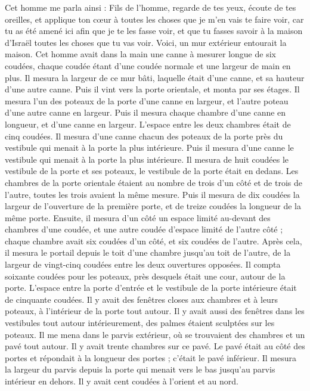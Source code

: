 \begin{multicols}{2}
Cet homme me parla ainsi : Fils de l’homme, regarde de tes yeux, écoute de tes oreilles, et applique ton cœur à toutes les choses que je m'en vais te faire voir, car tu as été amené ici afin que je te les fasse voir, et que tu fasses savoir à la maison d'Israël toutes les choses que tu vas voir.
Voici, un mur extérieur entourait la maison. Cet homme avait dans la main une canne à mesurer longue de six coudées, chaque coudée étant d'une coudée normale et une largeur de main en plus. Il mesura la largeur de ce mur bâti, laquelle était d'une canne, et sa hauteur d'une autre canne.
Puis il vint vers la porte orientale, et monta par ses étages. Il mesura l'un des poteaux de la porte d'une canne en largeur, et l'autre poteau d'une autre canne en largeur.
Puis il mesura chaque chambre d'une canne en longueur, et d'une canne en largeur. L’espace entre les deux chambres était de cinq coudées. Il mesura d'une canne chacun des poteaux de la porte près du vestibule qui menait à la porte la plus intérieure.
Puis il mesura d'une canne le vestibule qui menait à la porte la plus intérieure.
Il mesura de huit coudées le vestibule de la porte et ses poteaux, le vestibule de la porte était en dedans.
Les chambres de la porte orientale étaient au nombre de trois d’un côté et de trois de l’autre, toutes les trois avaient la même mesure.
Puis il mesura de dix coudées la largeur de l'ouverture de la première porte, et de treize coudées la longueur de la même porte.
Ensuite, il mesura d'un côté un espace limité au-devant des chambres d'une coudée, et une autre coudée d'espace limité de l'autre côté ; chaque chambre avait six coudées d’un côté, et six coudées de l’autre.
Après cela, il mesura le portail depuis le toit d'une chambre jusqu'au toit de l'autre, de la largeur de vingt-cinq coudées entre les deux ouvertures opposées.
Il compta soixante coudées pour les poteaux, près desquels était une cour, autour de la porte.
L’espace entre la porte d’entrée et le vestibule de la porte intérieure était de cinquante coudées.
Il y avait des fenêtres closes aux chambres et à leurs poteaux, à l’intérieur de la porte tout autour. Il y avait aussi des fenêtres dans les vestibules tout autour intérieurement, des palmes étaient sculptées sur les poteaux.
Il me mena dans le parvis extérieur, où se trouvaient des chambres et un pavé tout autour. Il y avait trente chambres sur ce pavé.
Le pavé était au côté des portes et répondait à la longueur des portes ; c’était le pavé inférieur.
Il mesura la largeur du parvis depuis la porte qui menait vers le bas jusqu’au parvis intérieur en dehors. Il y avait cent coudées à l'orient et au nord.

\end{multicols}
